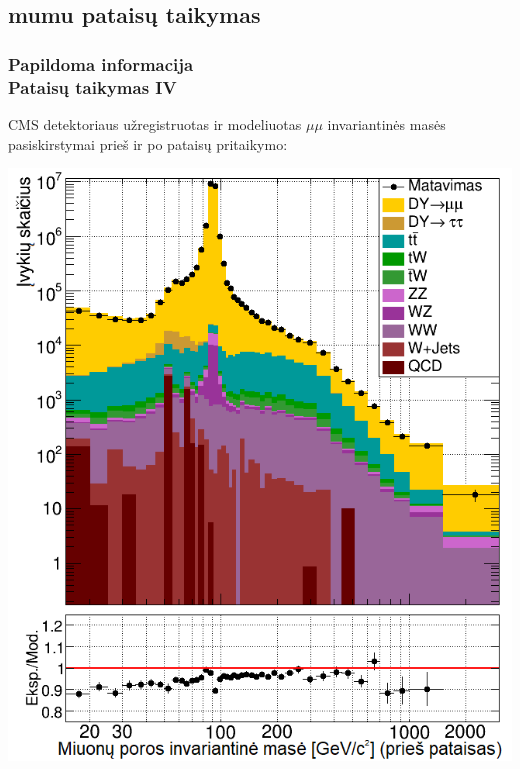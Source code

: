 \documentclass[xcolor=dvipsnames]{beamer}
\newcommand{\mumu}{\mu\mu}
\begin{document}
\begin{frame}
	\subsection{mumu pataisų taikymas}
	\frametitle{Papildoma informacija\\ \small Pataisų taikymas IV}
	CMS detektoriaus užregistruotas ir modeliuotas $\mumu$ invariantinės masės pasiskirstymai prieš ir po pataisų pritaikymo:
	\begin{minipage}{0.49\textwidth}
		\centering
		\includegraphics[width=0.9\linewidth]{mumuMassBefore_SMALL.png}
	\end{minipage}
	\hfill
	\begin{minipage}{0.49\textwidth}
		\centering

\end{minipage}
\end{frame}
\end{document}
